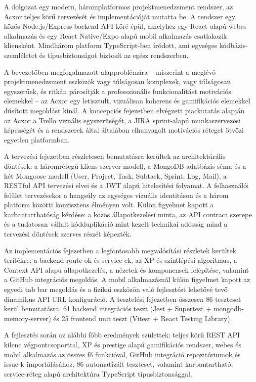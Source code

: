 
A dolgozat egy modern, háromplatformos projektmenedzsment rendszer, az Acxor teljes körű tervezését és implementációját mutatta be. A rendszer egy közös Node.js\slash Express backend API köré épül, amelyhez egy React alapú webes alkalmazás és egy React Native\slash Expo alapú mobil alkalmazás csatlakozik kliensként. Mindhárom platform TypeScript-ben íródott, ami egységes kódbázis-szemléletet és típusbiztonságot biztosít az egész rendszerben.

A bevezetőben megfogalmazott alapproblémára – miszerint a meglévő projektmenedzsment eszközök vagy túlságosan komplexek, vagy túlságosan egyszerűek, és ritkán párosítják a professzionális funkcionalitást motivációs elemekkel – az Acxor egy letisztult, vizuálisan koherens és gamifikációs elemekkel dúsított megoldást kínál. A koncepciós fejezetben elvégzett piackutatás alapján az Acxor a Trello vizuális egyszerűségét, a JIRA sprint-alapú munkaszervezési képességét és a rendszerek által általában elhanyagolt motivációs réteget ötvözi egyetlen platformban.

A tervezési fejezetben részletesen bemutatásra kerültek az architektúrális döntések: a háromrétegű kliens-szerver modell, a MongoDB adatbázis-séma és a hét Mongoose modell (User, Project, Task, Subtask, Sprint, Log, Mail), a RESTful API tervezési elvei és a JWT alapú hitelesítési folyamat. A felhasználói felület tervezésekor a hangsúly az egységes vizuális identitáson és a három platform közötti konzisztens élményen volt. Külön figyelmet kapott a karbantarthatóság kérdése: a közös állapotkezelési minta, az API contract szerepe és a tudatosan vállalt kódduplikáció mint kezelt technikai adósság mind a tervezési döntések szerves részét képezték.

Az implementációs fejezetben a legfontosabb megvalósítási részletek kerültek terítékre: a backend route-ok és service-ek, az XP és szintlépési algoritmus, a Context API alapú állapotkezelés, a nézetek és komponensek felépítése, valamint a GitHub integrációs megoldás. A mobil alkalmazásnál külön figyelmet kapott az egyedi tab bar megoldás és a fizikai eszközön való fejlesztést lehetővé tevő dinamikus API URL konfiguráció. A tesztelési fejezetben összesen 86 teszteset kerül bemutatásra: 61 backend integrációs teszt (Jest + Supertest + mongodb-memory-server) és 25 frontend unit teszt (Vitest + React Testing Library).

A fejlesztés során az alábbi főbb eredmények születtek: teljes körű REST API kilenc végpontcsoporttal, XP és prestige alapú gamifikációs rendszer, webes és mobil alkalmazás az összes fő funkcióval, GitHub integráció repozitóriumok és issue-k importálásához, 86 automatizált teszteset, valamint karbantartható, service-réteg alapú architektúra TypeScript típusbiztonsággal.

